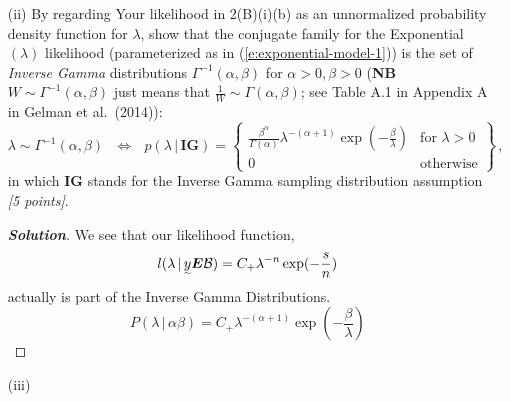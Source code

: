\documentclass[12pt]{article}
\newcommand{\given}{\, | \,}
\newenvironment{solution}{\begin{proof}[\textbf{\textit{Solution}}] }{\end{proof}}
\begin{document}
\begin{itemize}
\begin{itemize}
\begin{itemize}
\end{itemize}
\vspace{0.5in}
\item[(ii)]By regarding Your likelihood in 2(B)(i)(b) as an unnormalized probability density function for $\lambda$, show that the conjugate family for the Exponential$( \lambda )$ likelihood (parameterized as in (\ref{e:exponential-model-1})) is the set of \textit{Inverse Gamma} distributions $\Gamma^{ -1 } ( \alpha, \beta )$ for $\alpha > 0, \beta > 0$ (\textbf{NB} $W \sim \Gamma^{ -1 } ( \alpha, \beta )$ just means that $\frac{ 1 }{ W } \sim \Gamma ( \alpha, \beta )$; see Table A.1 in Appendix A in Gelman et al.~(2014)):
\begin{equation} \label{e:inverse-gamma-1}
\lambda \sim \Gamma^{ -1 } ( \alpha, \beta ) \ \ \ \iff \ \ \ p ( \lambda \given \bm{ IG } ) = \left\{ \begin{array}{cc} \frac{ \beta^\alpha }{ \Gamma ( \alpha ) }
\lambda^{ - ( \alpha + 1 ) } \exp \left( - \frac{ \beta }{ \lambda } \right)
& \textrm{for } \lambda > 0 \\ 0 & \mbox{otherwise} \end{array} \right\} \, ,
\end{equation}
in which $\bm{ IG }$ stands for the Inverse Gamma sampling distribution assumption \textit{[5 points]}.
\begin{tcolorbox}[breakable]
    \begin{solution}
        We see that our likelihood function,
        \[l(\lambda \given \undertilde{y}\bm{E}\mathcal{B}) = C_+\lambda^{-n}\exp(-\frac{s}{n})\] actually is part of the Inverse Gamma Distributions.
        \[P(\lambda \given \alpha \beta) = C_+\lambda^{-(\alpha + 1)} \exp(-\frac{\beta}{\lambda})\]
    \end{solution}
\end{tcolorbox}

\vspace{0.5in}

\item[(iii)]


\end{itemize}
\end{itemize}
\end{document}
